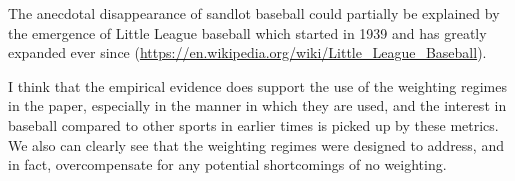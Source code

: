 \documentclass[11pt]{article}
\begin{document}
The anecdotal disappearance of sandlot baseball could partially be explained 
by the emergence of Little League baseball which started in 1939 and has 
greatly expanded ever since 
(\url{https://en.wikipedia.org/wiki/Little_League_Baseball}).

I think that the empirical evidence does support the use of the 
weighting regimes in the paper, especially in the manner in which they are 
used, and the interest in baseball compared to other sports in earlier times 
is picked up by these metrics.  
We also can clearly see that the weighting regimes were designed to address, 
and in fact, overcompensate for any potential shortcomings of no weighting.



%

%
\end{document}
